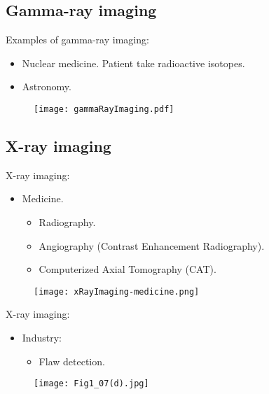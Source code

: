 
\subsection*{Gamma-ray imaging}


\begin{frame}
Examples of gamma-ray imaging:
\begin{itemize}
\item Nuclear medicine. Patient take radioactive isotopes.
\item Astronomy.
\end{itemize}
\begin{figure}
\texttt{[image: gammaRayImaging.pdf]}
\end{figure}
\end{frame}


\subsection*{X-ray imaging}


\begin{frame}
X-ray imaging:
\begin{itemize}
\item Medicine.
\begin{itemize}
\item Radiography.
\item Angiography (Contrast Enhancement Radiography).
\item Computerized Axial Tomography (CAT).
\end{itemize}
\end{itemize}
\begin{figure}
\texttt{[image: xRayImaging-medicine.png]}
\end{figure}
\end{frame}


\begin{frame}
X-ray imaging:
\begin{itemize}
\item Industry:
\begin{itemize}
\item Flaw detection.
\end{itemize}
\end{itemize}
\begin{figure}
\texttt{[image: Fig1\_07(d).jpg]}
\end{figure}
\end{frame}

